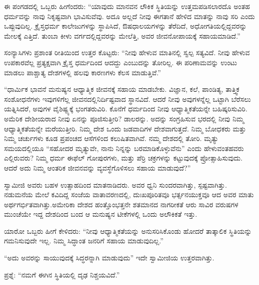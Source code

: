 \vskip 3pt

ಈ ಪಂಗಡದಲ್ಲಿ ಒಬ್ಬರು ಹೀಗೆಂದರು: “ಯಾವುದು ಮಾನವನ ಲೌಕಿಕ ಸ್ಥಿತಿಯನ್ನು ಉತ್ತಮಪಡಿಸಲಾರದೊ ಅಂತಹ ಧರ್ಮವನ್ನು ನಾವು ನಿಕೃಷ್ಟವಾಗಿ ಭಾವಿಸುವೆವು. ಅದೂ ಅಲ್ಲದೆ ನೀವು ಈಗತಾನೆ ಹೇಳಿದ ಮಾತನ್ನು ನಾವು ಸರಿ ಎಂದು ಒಪ್ಪುವುದಿಲ್ಲ. ಕ್ರೈಸ್ತಧರ್ಮ ಕಾಲೇಜುಗಳನ್ನು ಸ್ಥಾಪಿಸಿದೆ, ಔಷಧಾಲಯಗಳನ್ನು ತೆರೆದಿದೆ, ಅಧೋಗತಿಯಲ್ಲಿದ್ದವರನ್ನು ಮೇಲಕ್ಕೆ ಎತ್ತಿದೆ. ತುಂಬಾ ಕೀಳು ವರ್ಗದಲ್ಲಿದ್ದವರನ್ನು ಮೇಲೆತ್ತಿ, ಅವರ ಜೀವನೋಪಾ\-ಯಕ್ಕೆ ಸಹಾಯಮಾಡಿದೆ.”

\vskip 3pt

ಸಂನ್ಯಾಸಿಗಳು ಪ್ರಶಾಂತ ರೀತಿಯಿಂದ ಉತ್ತರ ಕೊಟ್ಟರು: “ನೀವು ಹೇಳುವ ಮಾತಿನಲ್ಲಿ ಸ್ವಲ್ಪ ಸತ್ಯವಿದೆ. ನೀವು ಹೇಳುವ ಉಪಕಾರವೆಲ್ಲ ಪ್ರತ್ಯಕ್ಷವಾಗಿ ಕ್ರೈಸ್ತ ಧರ್ಮದಿಂದ ಆದದ್ದು ಎಂಬುದನ್ನು ತೋರಿಲ್ಲ. ಈ ಪರಿಣಾಮವನ್ನು ಉಂಟು ಮಾಡಲು ಪಾಶ್ಚಾತ್ಯ ದೇಶಗಳಲ್ಲಿ ಹಲವು ಕಾರಣಗಳು ಕೆಲಸ ಮಾಡುತ್ತಿವೆ.”

\vskip 3pt

“ಧಾರ್ಮಿಕ ಭಾವನೆ ಮನುಷ್ಯನ ಆಧ್ಯಾತ್ಮಿಕ ಜೀವನಕ್ಕೆ ಸಹಾಯ ಮಾಡಬೇಕು. ವಿಜ್ಞಾನ, ಕಲೆ, ಪಾಂಡಿತ್ಯ, ತಾತ್ತ್ವಿಕ ಸಂಶೋಧನೆಗಳು ಇವುಗಳಿಗೆಲ್ಲ ಜೀವನದಲ್ಲಿ\break ನಿರ್ದಿಷ್ಟವಾದ ಸ್ಥಾನವಿದೆ. ಆದರೆ ನೀವು ಅವುಗಳನ್ನೆಲ್ಲ ಒಟ್ಟಾಗಿ ಬೆರೆಸಲು ಯತ್ನಿಸಿದರೆ, ಅವುಗಳ ವೈಶಿಷ್ಟ್ಯಕ್ಕೆ ಭಂಗತರುವಿರಿ. ಕೊನೆಗೆ ಧರ್ಮದಿಂದ ನೀವು ಆಧ್ಯಾತ್ಮಿಕತೆಯನ್ನೇ ಬಹಿಷ್ಕರಿಸುವಿರಿ. ಅಮೆರಿಕ ದೇಶೀಯರಾದ ನೀವು ಏನನ್ನು ಪೂಜಿಸುತ್ತೀರಿ? ಡಾಲರನ್ನು. ಅದನ್ನು ಸಂಗ್ರಹಿಸುವ ಭರದಲ್ಲಿ ನೀವು ನಿಮ್ಮ ಆಧ್ಯಾತ್ಮಿಕತೆಯನ್ನೇ ಮರೆಯುತ್ತೀರಿ. ನಿಮ್ಮ ದೇಶ ಒಂದು ಜಡವಾದಿಗಳ ದೇಶವಾಗುತ್ತದೆ. ನಿಮ್ಮ ಬೋಧಕರು ಮತ್ತು ನಿಮ್ಮ ಚರ್ಚುಗಳು ಕೂಡ ಪ್ರಪಂಚದ ಆಸೆಗಳಿಂದ ಕಲುಷಿತವಾಗಿವೆ. ನಮ್ಮ ದೇಶದಲ್ಲಿ ತೋರಿ. ಮೃತ್ಯು ಸಮಯದಲ್ಲಿಯೂ “ಸಹೋದರ ಮೃತ್ಯುವೇ, ನಾನು ನಿನ್ನನ್ನು ಬರಮಾಡಿಕೊಳ್ಳುವೆನು” ಎಂದು ಹೇಳುವಂತಹವರು ಎಲ್ಲಿರುವರು? ನಿಮ್ಮ ಧರ್ಮ ಈಫೆಲ್​ ಗೋಪುರಗಳು, ಮತ್ತು ಪೆರ್ರಿ ಚಕ್ರಗಳನ್ನು ಕಟ್ಟುವುದಕ್ಕೆ ಪ್ರೋತ್ಸಾಹಿಸುವುದು. ಆದರೆ ಅದು ನಿಮ್ಮ ಆಂತರಿಕ ಜೀವನವನ್ನು ವ್ಯವಸ್ಥೆಗೊಳಿಸಲು ಸಹಾಯ ಮಾಡುವುದೆ?”

\vskip 3pt

ಸ್ವಾಮೀಜಿ ಅವರು ಬಹಳ ಉತ್ಸಾಹದಿಂದ ಮಾತನಾಡಿದರು. ಅವರ ಧ್ವನಿ ಸುಂದರವಾಗಿತ್ತು, ಸ್ಪಷ್ಟವಾಗಿತ್ತು. ನಡುಮನೆಯ ಮೇಲೆ ಕವಿದಿದ್ದ ಸಂಜೆಯ ವಾತಾವರಣದಲ್ಲಿ, ದುಃಖಪೂರಿತವೂ ಭರ್ತ್ಸನಯುಕ್ತವೂ ಆದ ಅವರ ಮಾತು ಅರ್ಥಗರ್ಭಿತವಾಗಿತ್ತು.\break ಅಮೇರಿಕಾ ದೇಶದ ಹಂತ್ತೊಂಭತ್ತನೇ ಶತಮಾನದ ನಾಗರೀಕತೆ ಆರು ಸಾವಿರ ವರುಷಗಳ ಮುಂಚೆಯೇ ಇದ್ದ ದೇಶದಿಂದ ಬಂದ ಆ ಮನುಷ್ಯನ ಟೀಕೆಗಳಲ್ಲಿ ಒಂದು ಅಲೌಕಿಕತೆ ಇತ್ತು.

\vskip 3pt

ಯಾರೋ ಒಬ್ಬರು ಹೀಗೆ ಕೇಳಿದರು: “ನೀವು ಆಧ್ಯಾತ್ಮಿಕತೆಯನ್ನು ಅನುಸರಿಸಿಕೊಂಡು ಹೋದರೆ ತಾತ್ಕಾಲಿಕ ಸ್ಥಿತಿಯನ್ನು ಗಮನಿಸುವುದೇ ಇಲ್ಲ. ನಿಮ್ಮ ಸಿದ್ಧಾಂತ ಜನರಿಗೆ ಸಹಾಯ ಮಾಡುವುದಿಲ್ಲ.”

\vskip 3pt

“ಅದು ಅವರನ್ನು ಸಾಯುವುದಕ್ಕೆ ಸಿದ್ಧರನ್ನಾಗಿ ಮಾಡುವುದು” ಇದೇ ಸ್ವಾಮೀಜಿಯ ಉತ್ತರವಾಗಿತ್ತು.

\vskip 3pt

ಪ್ರಶ್ನೆ: “ನಮಗೆ ಈಗಿನ ಸ್ಥಿತಿಯಲ್ಲಿ ದೃಢ ನಿಶ್ಚಯವಿದೆ.”

